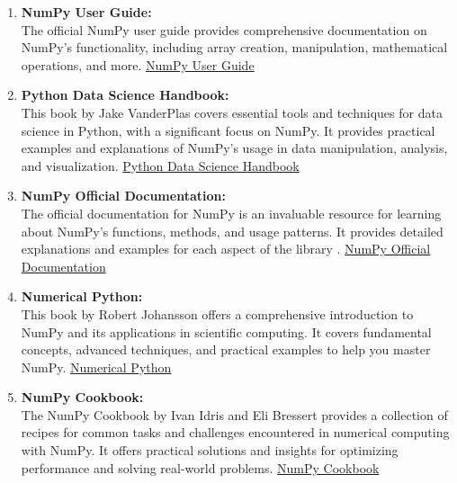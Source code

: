 \begin{enumerate}
	\item \textbf{NumPy User Guide:} \\
	The official NumPy user guide provides comprehensive documentation on NumPy's functionality, including array creation, manipulation, mathematical operations, and more. 
	\href{https://numpy.org/doc/stable/user/index.html}{NumPy User Guide}
	
	\item \textbf{Python Data Science Handbook:} \\
	This book by Jake VanderPlas covers essential tools and techniques for data science in Python, with a significant focus on NumPy. It provides practical examples and explanations of NumPy's usage in data manipulation, analysis, and visualization. 
	\href{https://jakevdp.github.io/PythonDataScienceHandbook/}{Python Data Science Handbook}
	
	\item \textbf{NumPy Official Documentation:} \\
	The official documentation for NumPy is an invaluable resource for learning about NumPy's functions, methods, and usage patterns. It provides detailed explanations and examples for each aspect of the library \cite{NumPy:2024}. 
	\href{https://numpy.org/doc/stable/}{NumPy Official Documentation}
	
	\item \textbf{Numerical Python:} \\
	This book by Robert Johansson offers a comprehensive introduction to NumPy and its applications in scientific computing. It covers fundamental concepts, advanced techniques, and practical examples to help you master NumPy. 
	\href{https://www.apress.com/gp/book/9781484242452}{Numerical Python}
	
	\item \textbf{NumPy Cookbook:} \\
	The NumPy Cookbook by Ivan Idris and Eli Bressert provides a collection of recipes for common tasks and challenges encountered in numerical computing with NumPy. It offers practical solutions and insights for optimizing performance and solving real-world problems. 
	\href{https://www.packtpub.com/product/numpy-1-5-cookbook/9781849515306}{NumPy Cookbook}
\end{enumerate}